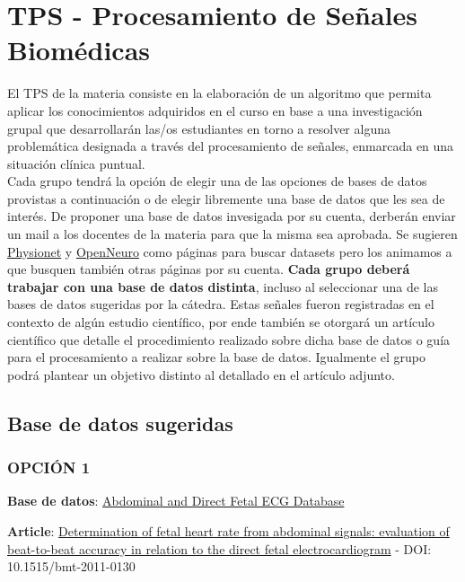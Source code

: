 \documentclass[10pt]{article}
\begin{document}
\newpage

\section{TPS - Procesamiento de Señales Biomédicas}

El TPS de la materia consiste en la elaboración de un algoritmo que permita aplicar los conocimientos adquiridos en el curso en base a una investigación grupal que desarrollarán las/os estudiantes en torno a resolver alguna problemática designada a través del procesamiento de señales, enmarcada en una situación clínica puntual.
\\
Cada grupo tendrá la opción de elegir una de las opciones de  bases de datos provistas a continuación o de elegir libremente una base de datos que les sea de interés. De proponer una base de datos invesigada por su cuenta, derberán enviar un mail a los docentes de la materia para que la misma sea aprobada. Se sugieren \href{https://physionet.org/about/database/}{Physionet} y \href{https://openneuro.org/}{OpenNeuro} como páginas para buscar datasets pero los animamos a que busquen también otras páginas por su cuenta. \textbf{Cada grupo deberá trabajar con una base de datos distinta}, incluso al seleccionar una de las bases de datos sugeridas por la cátedra. Estas señales fueron registradas en el contexto de algún estudio científico, por ende también se otorgará un artículo científico que detalle el procedimiento realizado sobre dicha base de datos o guía para el procesamiento a realizar sobre la base de datos. Igualmente el grupo podrá plantear un objetivo distinto al detallado en el artículo adjunto. 

\subsection*{Base de datos sugeridas}

\subsubsection*{OPCIÓN 1}

\textbf{Base de datos}: \href{https://physionet.org/content/adfecgdb/1.0.0/}{Abdominal and Direct Fetal ECG Database}

\textbf{Article}: \href{https://pubmed.ncbi.nlm.nih.gov/25854665/}{Determination of fetal heart rate from abdominal signals: evaluation of beat-to-beat accuracy in relation to the direct fetal electrocardiogram} - DOI: 10.1515/bmt-2011-0130
\end{document}
